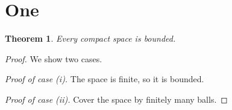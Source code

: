 \documentclass{article}
\newtheorem{thm}{Theorem}
\begin{document}
\section{One}
\begin{thm} Every compact space is bounded. \end{thm}
\begin{proof} We show two cases.

{\it Proof of case (i).} The space is finite, so it is bounded.

{\it Proof of case (ii).} Cover the space by finitely many balls.
\end{proof}
\end{document}
